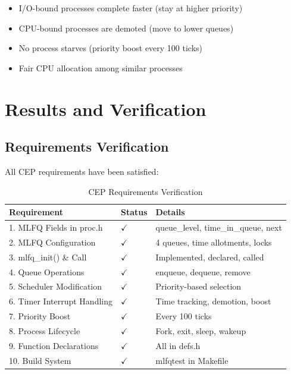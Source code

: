 \documentclass[11pt,a4paper]{article}
\begin{document}
\begin{itemize}
    \item[\textcolor{green!70!black}{$\checkmark$}] I/O-bound processes complete faster (stay at higher priority)
    \item[\textcolor{green!70!black}{$\checkmark$}] CPU-bound processes are demoted (move to lower queues)
    \item[\textcolor{green!70!black}{$\checkmark$}] No process starves (priority boost every 100 ticks)
    \item[\textcolor{green!70!black}{$\checkmark$}] Fair CPU allocation among similar processes
\end{itemize}

\section{Results and Verification}

\subsection{Requirements Verification}

All CEP requirements have been satisfied:

\begin{table}[h]
\centering
\begin{tabular}{@{}lll@{}}
\toprule
\textbf{Requirement} & \textbf{Status} & \textbf{Details} \\
\midrule
1. MLFQ Fields in proc.h & \textcolor{green!70!black}{$\checkmark$} & queue\_level, time\_in\_queue, next \\
2. MLFQ Configuration & \textcolor{green!70!black}{$\checkmark$} & 4 queues, time allotments, locks \\
3. mlfq\_init() \& Call & \textcolor{green!70!black}{$\checkmark$} & Implemented, declared, called \\
4. Queue Operations & \textcolor{green!70!black}{$\checkmark$} & enqueue, dequeue, remove \\
5. Scheduler Modification & \textcolor{green!70!black}{$\checkmark$} & Priority-based selection \\
6. Timer Interrupt Handling & \textcolor{green!70!black}{$\checkmark$} & Time tracking, demotion, boost \\
7. Priority Boost & \textcolor{green!70!black}{$\checkmark$} & Every 100 ticks \\
8. Process Lifecycle & \textcolor{green!70!black}{$\checkmark$} & Fork, exit, sleep, wakeup \\
9. Function Declarations & \textcolor{green!70!black}{$\checkmark$} & All in defs.h \\
10. Build System & \textcolor{green!70!black}{$\checkmark$} & mlfqtest in Makefile \\
\bottomrule
\end{tabular}
\caption{CEP Requirements Verification}
\end{table}
\end{document}

